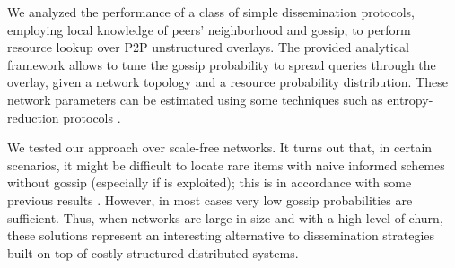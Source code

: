 \documentclass{sig-alternate}
\begin{document}
We analyzed the performance of a class of simple dissemination protocols, employing local knowledge of peers' neighborhood and gossip, to perform resource lookup over \ac{P2P} unstructured overlays. 
The provided analytical framework allows to tune the gossip probability to spread queries through the overlay, given a network topology and a resource probability distribution. These network parameters can be estimated using some techniques such as entropy-reduction protocols \cite{montresorMJB04}.

We tested our approach over scale-free networks.
It turns out that, in certain scenarios, it might be difficult to locate rare items with naive informed schemes without gossip (especially if  is exploited); this is in accordance with some previous results \cite{PuttaswamySZ08}. However, in most cases very low gossip probabilities are sufficient.
Thus, when networks are large in size and with a high level of churn, these solutions represent an interesting alternative to dissemination strategies built on top of costly structured distributed systems.
\end{document}
